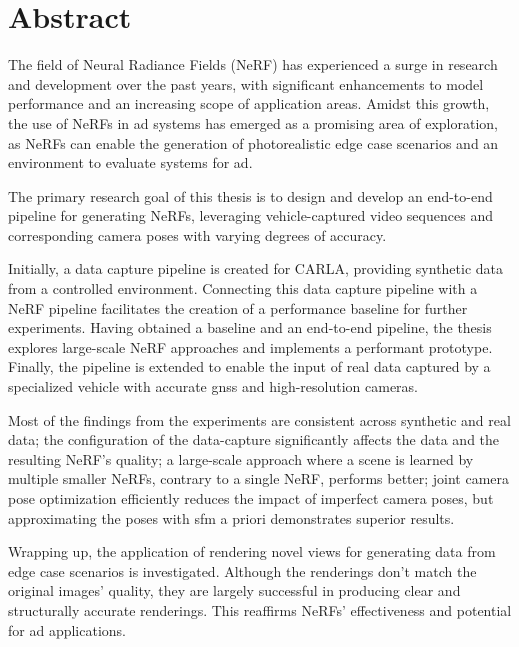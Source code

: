 \chapter*{Abstract}

The field of Neural Radiance Fields (NeRF) has experienced a surge in research and development over the past years, with significant enhancements to model performance and an increasing scope of application areas. Amidst this growth, the use of NeRFs in \acrfull{ad} systems has emerged as a promising area of exploration, as NeRFs can enable the generation of photorealistic edge case scenarios and an environment to evaluate systems for \acrshort{ad}.

The primary research goal of this thesis is to design and develop an end-to-end pipeline for generating NeRFs, leveraging vehicle-captured video sequences and corresponding camera poses with varying degrees of accuracy.

Initially, a data capture pipeline is created for CARLA, providing synthetic data from a controlled environment. Connecting this data capture pipeline with a NeRF pipeline facilitates the creation of a performance baseline for further experiments. Having obtained a baseline and an end-to-end pipeline, the thesis explores large-scale NeRF approaches and implements a performant prototype. Finally, the pipeline is extended to enable the input of real data captured by a specialized vehicle with accurate \acrfull{gnss} and high-resolution cameras.

Most of the findings from the experiments are consistent across synthetic and real data; the configuration of the data-capture significantly affects the data and the resulting NeRF's quality; a large-scale approach where a scene is learned by multiple smaller NeRFs, contrary to a single NeRF, performs better; joint camera pose optimization efficiently reduces the impact of imperfect camera poses, but approximating the poses with \acrfull{sfm} a priori demonstrates superior results.



Wrapping up, the application of rendering novel views for generating data from edge case scenarios is investigated. Although the renderings don't match the original images' quality, they are largely successful in producing clear and structurally accurate renderings. This reaffirms NeRFs' effectiveness and potential for \acrshort{ad} applications.